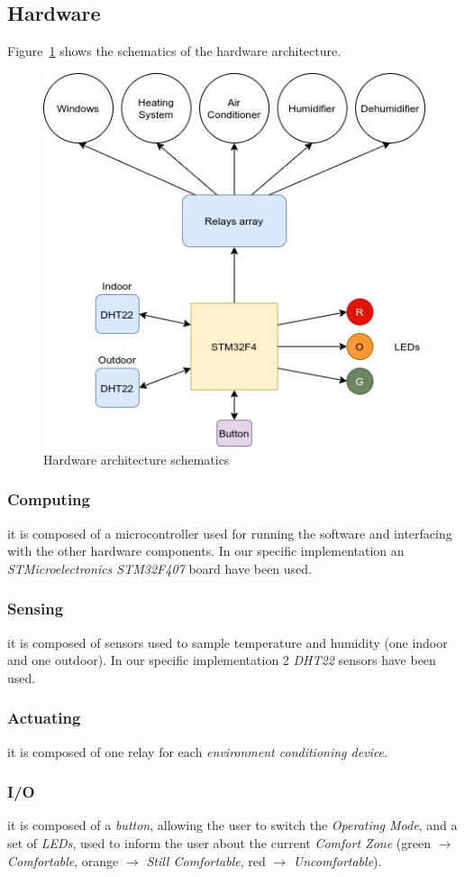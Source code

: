 \documentclass[peerreview]{IEEEtran}
\begin{document}
\subsection{Hardware}
Figure~\ref{fig:hw} shows the schematics of the hardware architecture.
\begin{figure}[!htbp]
	\centering
	\includegraphics[width=0.7\columnwidth]{hw} 
	\caption{Hardware architecture schematics}
	\label{fig:hw}
\end{figure}
\subsubsection{Computing}
it is composed of a microcontroller used for running the software and interfacing
with the other hardware components. In our specific implementation an
\emph{STMicroelectronics STM32F407} board have been used.
\subsubsection{Sensing}
it is composed of sensors used to sample temperature and humidity (one indoor
and one outdoor). In our specific implementation 2 \emph{DHT22} sensors have been
used.
\subsubsection{Actuating}
it is composed of one relay for each \emph{environment conditioning device}.
\subsubsection{I/O}
it is composed of a \emph{button}, allowing the user to switch the
\emph{Operating Mode}, and a set of \emph{LEDs}, used to inform the user about
the current \emph{Comfort Zone} (green $\rightarrow$ \emph{Comfortable}, orange
$\rightarrow$ \emph{Still Comfortable}, red $\rightarrow$ \emph{Uncomfortable}).
\end{document}
